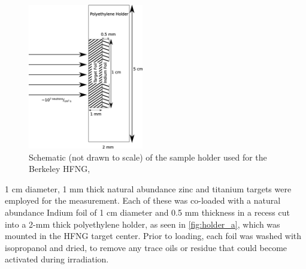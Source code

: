 \documentclass[5p]{elsarticle}
\begin{document}
\begin{figure}
    \centering
        \includegraphics[height=2.5in]{./figures/holder.pdf}
        \caption{Schematic (not drawn to scale) of the sample holder used for the Berkeley HFNG,}
        \label{fig:holder_a}
\end{figure}


1 cm diameter, 1 mm thick natural abundance zinc and titanium targets were employed for the measurement. Each of these was  co-loaded with a natural abundance Indium foil of 1 cm diameter and 0.5 mm thickness in a recess cut into a 2-mm thick polyethylene holder, as seen in \autoref{fig:holder_a}, which was mounted in the HFNG target center. Prior to loading, each foil was washed with isopropanol and dried, to remove any trace oils or residue that could become activated during irradiation. 
\end{document}
